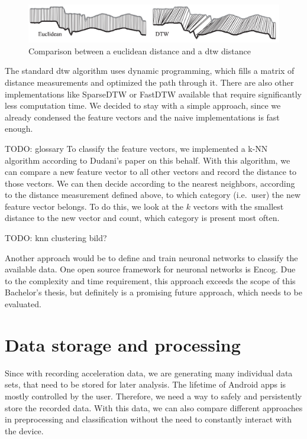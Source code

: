 \begin{figure}
    \includegraphics[width=\textwidth]{figures/EuclideanvsDTW.png}
    \caption{Comparison between a euclidean distance and a \gls{dtw} distance\cite{keogh2005exact}}
    \label{fig:euclideandtw}
\end{figure}

The standard \gls{dtw} algorithm uses dynamic programming, which fills a matrix of distance measurements and optimized the path through it. There are also other implementations like SparseDTW or FastDTW available that require significantly less computation time. We decided to stay with a simple approach, since we already condensed the feature vectors and the naive implementations is fast enough.

TODO: glossary
To classify the feature vectors, we implemented a k-NN algorithm according to Dudani's paper on this behalf\cite{dudani1976distance}. With this algorithm, we can compare a new feature vector to all other vectors and record the distance to those vectors. We can then decide according to the nearest neighbors, according to the distance measurement defined above, to which category (i.e.\ user) the new feature vector belongs. To do this, we look at the $k$ vectors with the smallest distance to the new vector and count, which category is present most often.

TODO: knn clustering bild?

Another approach would be to define and train neuronal networks to classify the available data. One open source framework for neuronal networks is Encog\cite{heaton2016encog}. Due to the complexity and time requirement, this approach exceeds the scope of this Bachelor's thesis, but definitely is a promising future approach, which needs to be evaluated.

\section{Data storage and processing}
Since with recording acceleration data, we are generating many individual data sets, that need to be stored for later analysis. The lifetime of Android apps is mostly controlled by the user. Therefore, we need a way to safely and persistently store the recorded data. With this data, we can also compare different approaches in preprocessing and classification without the need to constantly interact with the device.

